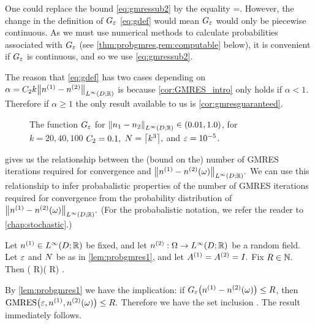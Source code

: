 One could replace the bound \cref{eq:gmressub2} by the equality
\beqs
\ms  =.
\eeqs
However, the change in the definition of $G_{\varepsilon}$ \cref{eq:gdef} would mean $G_{\varepsilon}$ would only be piecewise continuous. As we must use numerical methods to calculate probabilities associated with $G_{\varepsilon}$ (see \cref{thm:probgmres,rem:computable} below), it is convenient if $G_{\varepsilon}$ is continuous, and so we use \cref{eq:gmressub2}.
\ere

The reason that \cref{eq:gdef} has two cases depending on $\alpha = \Ct k \NLiDRR{\nso-\nst}$ is because \cref{cor:GMRES_intro} only holds if $\alpha < 1$. Therefore if $\alpha \geq 1$ the only result available to us is \cref{cor:gmresguaranteed}.
\ere

\begin{figure}
  \centering
  
  \caption[An upper bound on the number of GMRES iterations required for a nearby-preconditioned linear system.]{The function $G_{\varepsilon}$ for $\NLiDRR{\no-\nt} \in \mleft(0.01,1.0\mright)$, for $k=20,40,100$ $C_{2} = 0.1,$ $N=\ceil{k^3},$ and $\varepsilon = 10^{-5}$.\label{fig:G}}
    \end{figure}


 gives us the relationship between the (bound on the) number of GMRES iterations required for convergence and $\NLiDRR{\nso-\nst(\omega)}.$ We can use this relationship to infer probabalistic properties of the number of GMRES iterations required for convergence from the probability distribution of $\NLiDRR{\nso-\nst(\omega)}.$ (For the probabalistic notation, we refer the reader to \cref{chap:stochastic}.)

\label{thm:probgmres}
Let $\nso \in \LiDRR$ be fixed, and let $\nst:\Omega\rightarrow\LiDRR$ be a random field. Let $\varepsilon$ and $N$ be as in \cref{lem:probgmres1}, and let ${A}^{(1)} = {A}^{(2)} = I.$ Fix $ R \in \mathbb N.$ Then
\beq\label{eq:GMRESprob}
\PP\mleft(\Gfn{\NLiDRR{\nso-\nst}} \leq R\mright)\leq\PP\mleft(\GMRES{\eps}{\nso}{\nst} \leq R\mright) .
\eeq
\enth

By \cref{lem:probgmres1} we have the implication: if $\Gfn{\nso-\nst(\omega)} \leq R$, then $\GMRES{\eps}{\nso}{\nst(\omega)} \leq R.$ Therefore we have the set inclusion
\beqs
{} \subseteq {}.
\eeqs
The result immediately follows.
\epf



